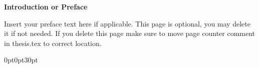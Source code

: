 \documentclass[12pt]{report}   %
\begin{document}







\clearpage
{}
\setcounter{page}{1} 



\begin{center}

\vspace*{5\baselineskip}
\textbf{\large Introduction or Preface}
\end{center}


\begin{flushleft}
\hspace{10mm}Insert your preface text here if applicable. This page is optional, you may delete it if not needed. If you delete this page make sure to move page counter comment in thesis.tex to correct location. 
\end{flushleft}






\titlespacing*{\chapter}
  {0pt}{0pt}{30pt}	%
  

\end{document}
